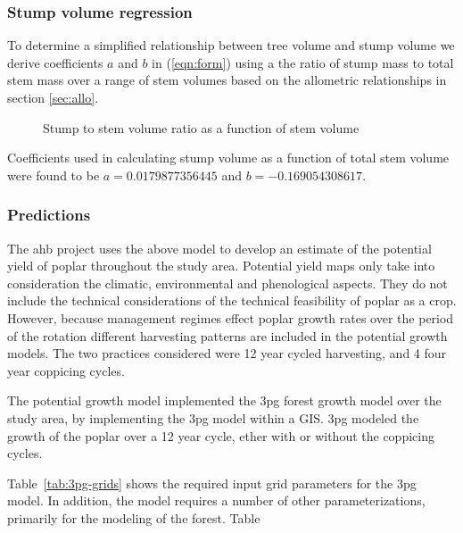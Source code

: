 \documentclass[10pt]{article}
\begin{document}
\subsubsection*{Stump volume regression}
To determine a simplified relationship between tree volume and stump volume we derive coefficients $a$ and $b$ in (\ref{eqn:form}) using a the ratio of stump mass to total stem mass over a range of stem volumes based on the allometric relationships in section \ref{sec:allo}.\begin{figure}[h]
     \centering
    \caption{Stump to stem volume ratio as a function of stem volume}
    \label{fig:stump_vol}
    \end{figure}
Coefficients used in calculating stump volume as a function of total stem volume were found to be $a=0.0179877356445$ and $b=-0.169054308617$.


\subsubsection{Predictions}

The \ac{ahb} project uses the above model to develop an estimate of
the potential yield of poplar throughout the study area.  Potential
yield maps only take into consideration the climatic, environmental
and phenological aspects.  They do not include the technical
considerations of the technical feasibility of poplar as a crop.
However, because management regimes effect poplar growth rates over
the period of the rotation different harvesting patterns are included
in the potential growth models.  The two practices considered were 12
year cycled harvesting, and 4 four year coppicing cycles.

The potential growth model implemented the \ac{3pg} forest growth
model over the study area, by implementing the \ac{3pg} model within a
\ac{GIS}.  \ac{3pg} modeled the growth of the poplar over a 12 year
cycle, ether with or without the coppicing cycles.  

Table~\ref{tab:3pg-grids} shows the required input grid parameters for
the \ac{3pg} model.  In addition, the model requires a number of other
parameterizations, primarily for the modeling of the forest. Table
\end{document}
